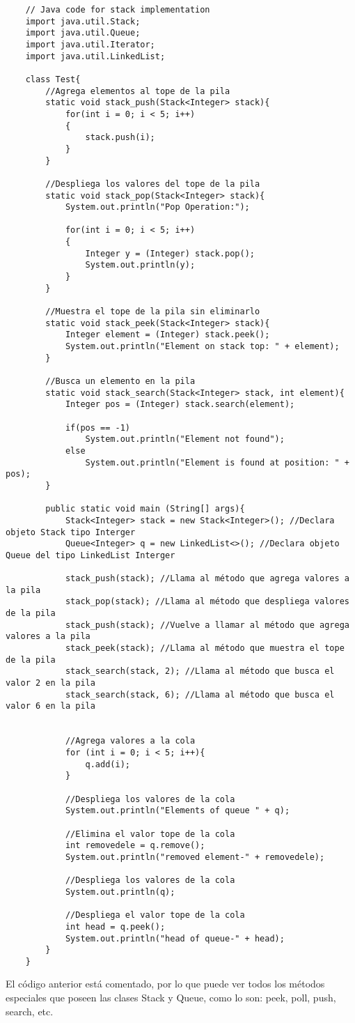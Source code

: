 \begin{lstlisting}
	// Java code for stack implementation
	import java.util.Stack;
	import java.util.Queue;
	import java.util.Iterator;
	import java.util.LinkedList;

	class Test{
		//Agrega elementos al tope de la pila
		static void stack_push(Stack<Integer> stack){
			for(int i = 0; i < 5; i++)
			{
				stack.push(i);
			}
		}
	
		//Despliega los valores del tope de la pila
		static void stack_pop(Stack<Integer> stack){
			System.out.println("Pop Operation:");

			for(int i = 0; i < 5; i++)
			{
				Integer y = (Integer) stack.pop();
				System.out.println(y);
			}
		}

		//Muestra el tope de la pila sin eliminarlo
		static void stack_peek(Stack<Integer> stack){
			Integer element = (Integer) stack.peek();
			System.out.println("Element on stack top: " + element);
		}
	
		//Busca un elemento en la pila
		static void stack_search(Stack<Integer> stack, int element){
			Integer pos = (Integer) stack.search(element);

			if(pos == -1)
				System.out.println("Element not found");
			else
				System.out.println("Element is found at position: " + pos);
		}

		public static void main (String[] args){
			Stack<Integer> stack = new Stack<Integer>(); //Declara objeto Stack tipo Interger
			Queue<Integer> q = new LinkedList<>(); //Declara objeto Queue del tipo LinkedList Interger

			stack_push(stack); //Llama al método que agrega valores a la pila
			stack_pop(stack); //Llama al método que despliega valores de la pila
			stack_push(stack); //Vuelve a llamar al método que agrega valores a la pila
			stack_peek(stack); //Llama al método que muestra el tope de la pila
			stack_search(stack, 2); //Llama al método que busca el valor 2 en la pila
			stack_search(stack, 6); //Llama al método que busca el valor 6 en la pila
			

			//Agrega valores a la cola
			for (int i = 0; i < 5; i++){
				q.add(i);
			}

			//Despliega los valores de la cola
			System.out.println("Elements of queue " + q);

			//Elimina el valor tope de la cola
			int removedele = q.remove();
			System.out.println("removed element-" + removedele);

			//Despliega los valores de la cola
			System.out.println(q);

			//Despliega el valor tope de la cola
			int head = q.peek();
			System.out.println("head of queue-" + head);
		}
	}
\end{lstlisting}
El código anterior está comentado, por lo que puede ver todos los métodos especiales que poseen las clases Stack y Queue, como lo son: peek, poll, push, search, etc.